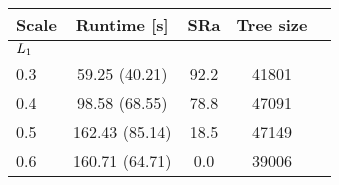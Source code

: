 \begin{tabular}{lcccc}
\toprule
{\bf Scale} & {\bf Runtime [s] } & {\bf SRa} & {\bf Tree size}\\ 
\midrule
\multicolumn{2}{l}{$ L_1 $} \\ 
0.3 & 59.25 (40.21) & 92.2  & 41801  \\
0.4 & 98.58 (68.55) & 78.8  & 47091  \\
0.5 & 162.43 (85.14) & 18.5  & 47149  \\
0.6 & 160.71 (64.71) & 0.0  & 39006  \\
\bottomrule
\end{tabular}
